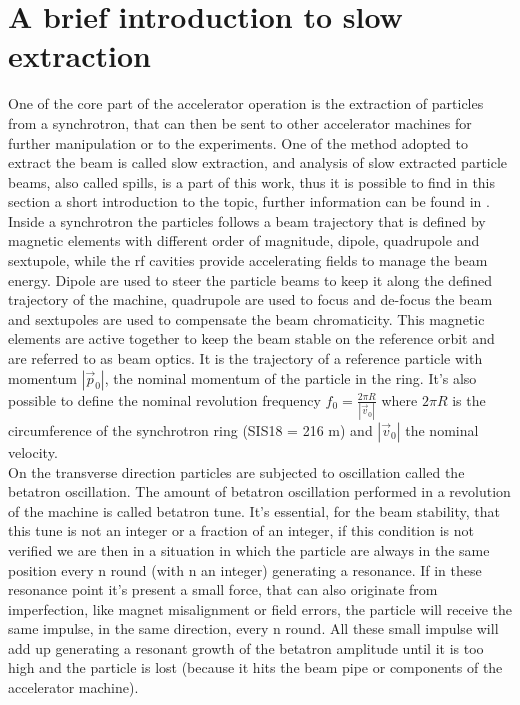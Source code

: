\documentclass[12pt,a4paper]{report}
\begin{document}
	\section{A brief introduction to slow extraction}
	One of the core part of the accelerator operation is the extraction of particles from a synchrotron, that can then be sent to other accelerator machines for further manipulation or to the experiments. One of the method adopted to extract the beam is called slow extraction, and analysis of slow extracted particle beams, also called spills, is a part of this work, thus it is possible to find in this section a short introduction to the topic, further information can be found in \cite{Slow_extraction} \cite{Cern_slow_extraction}.\\
	Inside a synchrotron the particles follows a beam trajectory that is defined by magnetic elements with different order of magnitude, dipole, quadrupole and sextupole, while the rf cavities provide accelerating fields to manage the beam energy. Dipole are used to steer the particle beams to keep it along the defined trajectory of the machine, quadrupole are used to focus and de-focus the beam and sextupoles are used to compensate the beam chromaticity. This magnetic elements are active together to keep the beam stable on the reference orbit and are referred to as beam optics. It is the trajectory of a reference particle with momentum $|\vec{p}_0|$, the nominal momentum of the particle in the ring. It's also possible to define the nominal revolution frequency $f_0 = \frac{2\pi R}{|\vec{v}_0|}$ where $2\pi R$ is the circumference of the synchrotron ring (SIS18 = 216 m) and $|\vec{v}_0| $ the nominal velocity. \\
	On the transverse direction particles are subjected to oscillation called the betatron oscillation. The amount of betatron oscillation performed in a revolution of the machine is called betatron tune. It's essential, for the beam stability, that this tune is not an integer or a fraction of an integer, if this condition is not verified we are then in a situation in which the particle are always in the same position every n round (with n an integer) generating a resonance. If in these resonance point it's present a small force, that can also originate from imperfection, like magnet misalignment or field errors, the particle will receive the same impulse, in the same direction, every n round. All these small impulse will add up generating a resonant growth of the betatron amplitude until it is too high and the particle is lost (because it hits the beam pipe or components of the accelerator machine).\\
\end{document}
